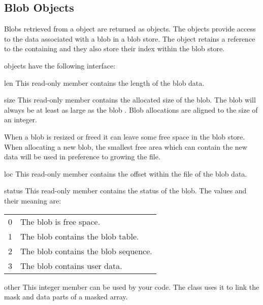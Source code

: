 \subsection{Blob Objects}

Blobs retrieved from a  object are returned as
 objects.  The  objects provide access to the
data associated with a blob in a blob store.  The  object
retains a reference to the containing  and they also
store their index within the blob store.

 objects have the following interface:

\begin{memberdesc}[Blob]{len}
This read-only member contains the length of the blob data.
\end{memberdesc}

\begin{memberdesc}[Blob]{size}
This read-only member contains the allocated size of the blob.  The
blob  will always be at least as large as the blob
.  Blob allocations are aligned to the size of an integer.

When a blob is resized or freed it can leave some free space in the
blob store.  When allocating a new blob, the smallest free area which
can contain the new data will be used in preference to growing the
file.
\end{memberdesc}

\begin{memberdesc}[Blob]{loc}
This read-only member contains the offset within the file of the blob
data.
\end{memberdesc}

\begin{memberdesc}[Blob]{status}
This read-only member contains the status of the blob.  The values and
their meaning are:

\begin{longtable}{l|l}
0 & The blob is free space. \\
1 & The blob contains the blob table. \\
2 & The blob contains the blob sequence. \\
3 & The blob contains user data. \\
\end{longtable}
\end{memberdesc}

\begin{memberdesc}[Blob]{other}
This integer member can be used by your code.  The 
class uses it to link the mask and data parts of a masked array.
\end{memberdesc}

